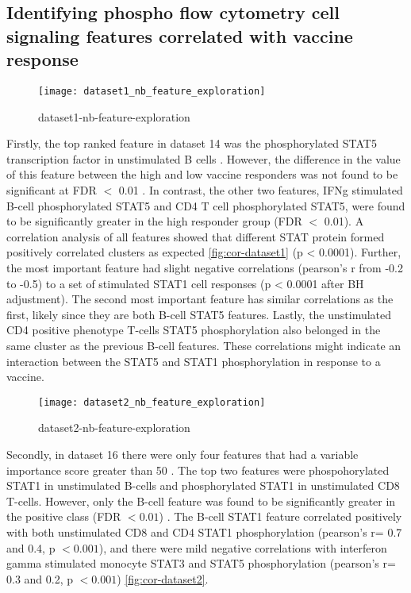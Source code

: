 \subsection{Identifying phospho flow cytometry cell signaling features correlated with vaccine response}

\begin{figure}[htpb]
    \centering
    \texttt{[image: dataset1\_nb\_feature\_exploration]}
    \caption{dataset1-nb-feature-exploration}
    \label{fig:dataset1-nb-feature-exploration}
\end{figure}

Firstly, the top ranked feature in dataset 14 was the phosphorylated STAT5 transcription factor in unstimulated B cells . However, the difference in the value of this feature between the high and low vaccine responders was not found to be significant at FDR $<$ 0.01 . In contrast, the other two features, IFNg stimulated B-cell phosphorylated STAT5 and CD4 T cell phosphorylated STAT5, were found to be significantly greater in the high responder group (FDR $<$ 0.01). A correlation analysis of all features showed that different STAT protein formed positively correlated clusters as expected \autoref{fig:cor-dataset1} (p < 0.0001). Further, the most important feature had slight negative correlations (pearson's r from -0.2 to -0.5) to a set of stimulated STAT1 cell responses (p < 0.0001 after BH adjustment). The second most important feature has similar correlations as the first, likely since they are both B-cell STAT5 features. Lastly, the unstimulated CD4 positive phenotype T-cells STAT5 phosphorylation also belonged in the same cluster as the previous B-cell features. These correlations might indicate an interaction between the STAT5 and STAT1 phosphorylation in response to a vaccine.

\begin{figure}[htpb]
    \centering
    \texttt{[image: dataset2\_nb\_feature\_exploration]}
    \caption{dataset2-nb-feature-exploration}
    \label{fig:dataset2-nb-feature-exploration}
\end{figure}

Secondly, in dataset 16 there were only four features that had a variable importance score greater than 50 . The top two features were phospohorylated STAT1 in unstimulated B-cells and phosphorylated STAT1 in unstimulated CD8 T-cells. However, only the B-cell feature was found to be significantly greater in the positive class (FDR \(< 0.01\)) . The B-cell STAT1 feature correlated positively with both unstimulated CD8 and CD4 STAT1 phosphorylation (pearson's r= 0.7 and 0.4, p \(< 0.001\)), and there were mild negative correlations with interferon gamma stimulated monocyte STAT3 and STAT5 phosphorylation (pearson's r= 0.3 and 0.2, p \(< 0.001\)) \autoref{fig:cor-dataset2}.

